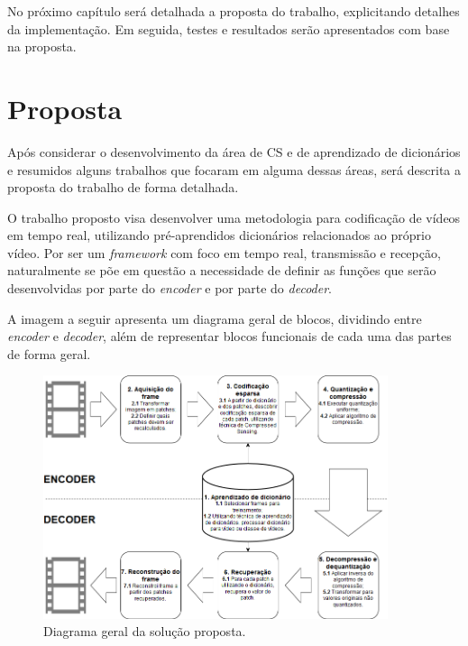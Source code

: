 \documentclass[cic,tc]{iiufrgs}
\begin{document}
No próximo capítulo será detalhada a proposta do trabalho, explicitando detalhes
da implementação.
Em seguida, testes e resultados serão apresentados com base na proposta.

\chapter{Proposta}
Após considerar o desenvolvimento da área de CS e de aprendizado de dicionários e 
resumidos alguns trabalhos que focaram em alguma dessas áreas, será descrita a proposta 
do trabalho de forma detalhada.

O trabalho proposto visa desenvolver uma metodologia para codificação de vídeos em
tempo real, utilizando pré-aprendidos dicionários relacionados ao próprio vídeo.
Por ser um \textit{framework} com foco em tempo real, transmissão e recepção, 
naturalmente se põe em questão 
a necessidade de definir as funções que serão desenvolvidas por parte do \textit{encoder}
e por parte do \textit{decoder}.


A imagem a seguir apresenta um diagrama geral de blocos, dividindo entre \textit{encoder}
e \textit{decoder}, além de representar blocos funcionais de cada uma das partes de 
forma geral.
\begin{figure}[H]
    \caption{Diagrama geral da solução proposta.}
    \begin{center}
        \includegraphics[width=0.9\textwidth]{img/DiagramaFinal.png}
    \end{center}
\end{figure}
\end{document}
